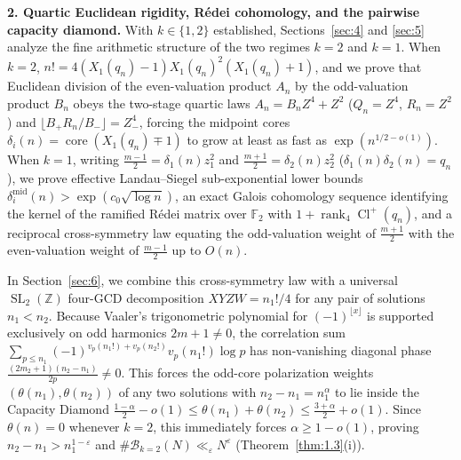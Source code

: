 \documentclass[11pt,reqno]{amsart}
\theoremstyle{remark}
\numberwithin{equation}{section}
\newcommand{\Z}{\mathbb{Z}}
\newcommand{\F}{\mathbb{F}}
\DeclareMathOperator{\core}{core}
\DeclareMathOperator{\Cl}{Cl}
\DeclareMathOperator{\SL}{SL}
\DeclareMathOperator{\rank}{rank}
\begin{document}
\medskip
\noindent\textbf{2. Quartic Euclidean rigidity, R\'edei cohomology, and the pairwise capacity diamond.}
With $k \in \{1, 2\}$ established, Sections~\ref{sec:4} and \ref{sec:5} analyze the fine arithmetic structure of the two regimes $k = 2$ and $k = 1$. When $k = 2$, $n! = 4(X_1(q_n) - 1)X_1(q_n)^2(X_1(q_n) + 1)$, and we prove that Euclidean division of the even-valuation product $A_n$ by the odd-valuation product $B_n$ obeys the two-stage quartic laws $A_n = B_n Z^4 + Z^2$ ($Q_n = Z^4$, $R_n = Z^2$) and $\lfloor B_+ R_n / B_- \rfloor = Z_-^4$, forcing the midpoint cores $\delta_i(n) = \core(X_1(q_n) \mp 1)$ to grow at least as fast as $\exp(n^{1/2-o(1)})$. When $k = 1$, writing $\frac{m-1}{2} = \delta_1(n)z_1^2$ and $\frac{m+1}{2} = \delta_2(n)z_2^2$ ($\delta_1(n)\delta_2(n) = q_n$), we prove effective Landau--Siegel sub-exponential lower bounds $\delta_i^{\mathrm{mid}}(n) > \exp(c_0\sqrt{\log n})$, an exact Galois cohomology sequence identifying the kernel of the ramified R\'edei matrix over $\F_2$ with $1 + \rank_4 \Cl^+(q_n)$, and a reciprocal cross-symmetry law equating the odd-valuation weight of $\frac{m+1}{2}$ with the even-valuation weight of $\frac{m-1}{2}$ up to $O(n)$.

In Section~\ref{sec:6}, we combine this cross-symmetry law with a universal $\SL_2(\Z)$ four-GCD decomposition $XYZW = n_1!/4$ for any pair of solutions $n_1 < n_2$. Because Vaaler's trigonometric polynomial for $(-1)^{\lfloor x \rfloor}$ is supported exclusively on odd harmonics $2m + 1 \ne 0$, the correlation sum $\sum_{p \le n_1} (-1)^{v_p(n_1!) + v_p(n_2!)} v_p(n_1!)\log p$ has non-vanishing diagonal phase $\frac{(2m_2+1)(n_2-n_1)}{2p} \ne 0$. This forces the odd-core polarization weights $(\theta(n_1), \theta(n_2))$ of any two solutions with $n_2 - n_1 = n_1^\alpha$ to lie inside the Capacity Diamond $\frac{1-\alpha}{2} - o(1) \le \theta(n_1) + \theta(n_2) \le \frac{3+\alpha}{2} + o(1)$. Since $\theta(n) = 0$ whenever $k = 2$, this immediately forces $\alpha \ge 1 - o(1)$, proving $n_2 - n_1 > n_1^{1-\varepsilon}$ and $\#\mathcal{B}_{k=2}(N) \ll_\varepsilon N^\varepsilon$ (Theorem~\ref{thm:1.3}(i)).
\end{document}
